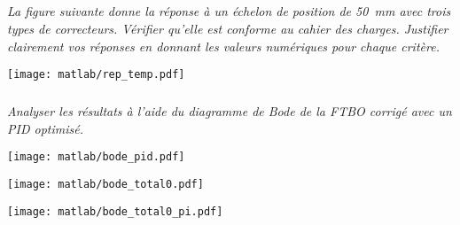 \begin{multicols}{2}
\subparagraph{}\textit{La figure suivante %
donne la réponse à un échelon de position de \SI{50}{mm} avec trois types de correcteurs. Vérifier qu'elle est conforme au cahier des charges. Justifier clairement vos réponses en donnant les valeurs numériques pour chaque critère.}


\begin{center}
\texttt{[image: matlab/rep\_temp.pdf]}
\end{center}


\subparagraph{}\textit{Analyser les résultats à l'aide du diagramme de Bode de la FTBO corrigé avec un PID optimisé.}%

\begin{center}
\texttt{[image: matlab/bode\_pid.pdf]}
\end{center}


\begin{center}
\texttt{[image: matlab/bode\_total0.pdf]}
\end{center}

\begin{center}
\texttt{[image: matlab/bode\_total0\_pi.pdf]}
\end{center}
%


\end{multicols}

